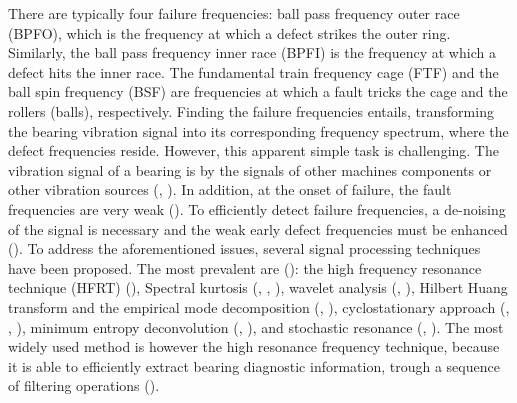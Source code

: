\documentclass[../Main/thesis.tex]{subfiles}
\begin{document}
\justify
There are typically four failure frequencies: ball pass frequency outer race (BPFO), which is the frequency at which a defect strikes the outer ring. Similarly, the ball pass frequency inner race (BPFI) is the frequency at which a defect hits the inner race. The fundamental train frequency cage (FTF) and the ball spin frequency (BSF) are frequencies at which a fault tricks the cage and the rollers (balls), respectively.
\justify
Finding the failure frequencies entails, transforming the bearing vibration signal into its corresponding frequency spectrum, where the defect frequencies reside. However, this apparent simple task is challenging. The vibration signal of a bearing is  by the signals of other machines components or other vibration sources (\cite{zhao2014}, \cite{mcfadden1984a}). In addition, at the onset of failure, the fault frequencies are very weak (\cite{zhao2014}). To efficiently detect failure frequencies, a de-noising of the signal is necessary and the weak early defect frequencies must be enhanced (\cite{zhao2014}). 
\justify
To address the aforementioned issues, several signal processing techniques have been proposed. The most prevalent are (\cite{zhao2014}): the high frequency resonance technique (HFRT) (\cite{darlow1974}), Spectral kurtosis (\cite{antoni2006a}, \cite{antoni2006b}, \cite{antoni2007}), wavelet analysis (\cite{lin2000}, \cite{qiu2006}), Hilbert Huang transform and the empirical mode decomposition (\cite{yu2005}, \cite{lei2011}), cyclostationary approach (\cite{antoni2004}, \cite{borghesani2013}, \cite{girondin2013}), minimum entropy deconvolution (\cite{sawalhi2007}, \cite{jiang2013} ), and stochastic resonance (\cite{tan2009}, \cite{he2012}). The most widely used method is however the high resonance frequency technique, because it is able to efficiently extract bearing diagnostic information, trough a sequence of filtering operations (\cite{zhao2014}).
\end{document}
